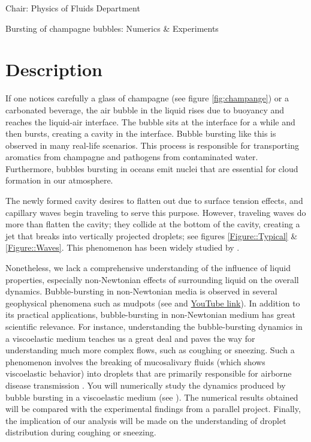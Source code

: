 \documentclass[a4paper,10pt]{article}
\begin{document}
\noindent Chair: Physics of Fluids Department
\begin{center}
 \begin{LARGE}
  Bursting of champagne bubbles: Numerics \& Experiments
 \end{LARGE}
\end{center}
\section*{Description}
If one notices carefully a glass of champagne (see figure \ref{fig:champange}) or a carbonated beverage, the air bubble in the liquid rises due to buoyancy and reaches the liquid-air interface. The bubble sits at the interface for a while and then bursts, creating a cavity in the interface. Bubble bursting like this is observed in many real-life scenarios. This process is responsible for transporting aromatics from champagne and pathogens from contaminated water. Furthermore, bubbles bursting in oceans emit nuclei that are essential for cloud formation in our atmosphere. 

The newly formed cavity desires to flatten out due to surface tension effects, and capillary waves begin traveling to serve this purpose. However, traveling waves do more than flatten the cavity; they collide at the bottom of the cavity, creating a jet that breaks into vertically projected droplets; see figures \ref{Figure::Typical} \& \ref{Figure::Waves}. This phenomenon has been widely studied by \citet{duchemin2002jet, walls2015jet, deike2018dynamics, gordillo2019capillary}.

Nonetheless, we lack a comprehensive understanding of the influence of liquid properties, especially non-Newtonian effects of surrounding liquid on the overall dynamics. Bubble-bursting in non-Newtonian media is observed in several geophysical phenomena such as mudpots (see \citet{sanjay_lohse_jalaal_2021} and \href{https://www.youtube.com/watch?v=a9hUsVq9q7U}{YouTube link}). In addition to its practical applications, bubble-bursting in non-Newtonian medium has great scientific relevance. For instance, understanding the bubble-bursting dynamics in a viscoelastic medium teaches us a great deal and paves the way for understanding much more complex flows, such as coughing or sneezing. Such a phenomenon involves the breaking of mucosalivary fluids (which shows viscoelastic behavior) into droplets that are primarily responsible for airborne disease transmission \citep{walls2017quantifying, bourouiba2021fluid}. You will numerically study the dynamics produced by bubble bursting in a viscoelastic medium (see \citet{dixit2024viscoelastic}). The numerical results obtained will be compared with the experimental findings from a parallel project. Finally, the implication of our analysis will be made on the understanding of droplet distribution during coughing or sneezing. 
\end{document}
